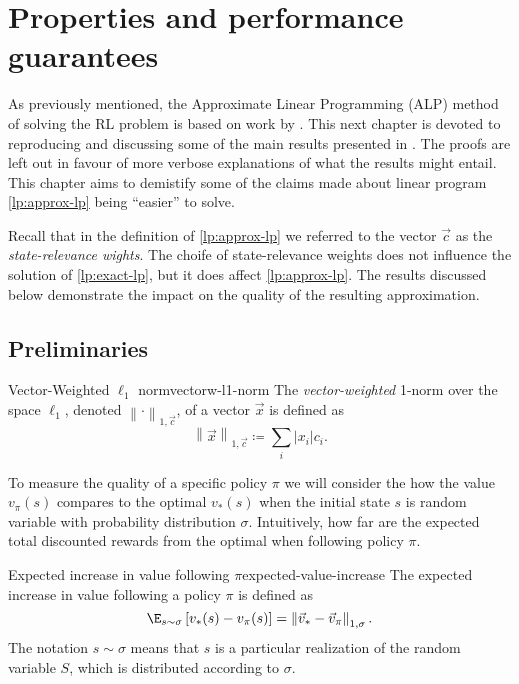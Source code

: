 \chapter{Properties and performance guarantees}
\label{chapter:PropertiesGuarantees}

As previously mentioned, the Approximate Linear Programming (ALP) method of
solving the RL problem is based on work by \citeauthor{farias2003LP2ADP}. This
next chapter is devoted to reproducing and discussing some of the main results
presented in \cite{farias2003LP2ADP}. The proofs are left out in favour of more
verbose explanations of what the results might entail. This chapter aims to
demistify some of the claims made about linear program \eqref{lp:approx-lp}
being ``easier'' to solve.

Recall that in the definition of \eqref{lp:approx-lp} we referred to the vector
$\vec{c}$ as the \emph{state-relevance wights}. The choife of state-relevance
weights does not influence the solution of \eqref{lp:exact-lp}, but it does
affect \eqref{lp:approx-lp}. The results discussed below demonstrate the impact
on the quality of the resulting approximation.

\section{Preliminaries}

\begin{dfn}{Vector-Weighted $\ell_1$ norm}{vectorw-l1-norm}
    The \emph{vector-weighted} 1-norm over the space $\ell_1$, denoted $\left\| \cdot \right\|_{1, \vec{c}}$, of a vector $\vec{x}$ is defined as
    \[
        \left\| \vec{x} \right\|_{1, \vec{c}} \coloneqq  \sum_i |x_i| c_i.
    \]
\end{dfn}

To measure the quality of a specific policy $\pi$ we will consider the how the
value $v_\pi(s)$ compares to the optimal $v_* (s)$ when the initial state $s$ is
random variable with probability distribution $\sigma$. Intuitively, how far are
the expected total discounted rewards from the optimal when following policy
$\pi$.

\begin{dfn}{Expected increase in value following $\pi$}{expected-value-increase}
    The expected increase in value following a policy $\pi$ is defined as
    \begin{equation}
        \label{eq:expected-value-increase}
        \E_{s \sim \sigma} \left[ v_* (s) - v_\pi (s) \right] = \left\| \vec{v
        }_* - \vec{v}_\pi \right\|_{1, \sigma}.
    \end{equation}
    The notation $s \sim \sigma$ means that $s$ is a particular realization of the
    random variable $S$, which is distributed according to $\sigma$.
\end{dfn}

